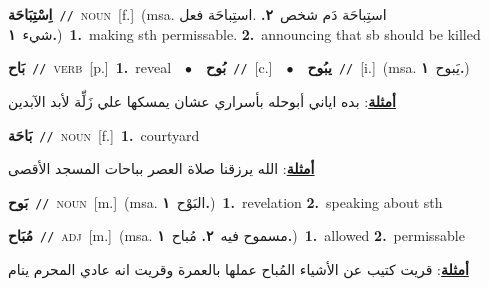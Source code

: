 \documentclass[10pt,a4paper,twoside]{article} %
\begin{document}
\begin{multicols}{2}
{\setlength\topsep{0pt}\textbf{\foreignlanguage{arabic}{اِسْتِبَاحَة}}\ {\color{gray}\texttt{//}\color{black}}\ \textsc{noun}\ [f.]\ \color{gray}(msa. \foreignlanguage{arabic}{استِباحَة دَم شخص}~\foreignlanguage{arabic}{\textbf{٢.}}  .\foreignlanguage{arabic}{استِباحَة فعل شيء}~\foreignlanguage{arabic}{\textbf{١.}})\color{black}\ \textbf{1.}~making sth permissable.  \textbf{2.}~announcing that sb should be killed\ } \vspace{2mm}

{\setlength\topsep{0pt}\textbf{\foreignlanguage{arabic}{بَاح}}\ {\color{gray}\texttt{//}\color{black}}\ \textsc{verb}\ [p.]\ \textbf{1.}~reveal\ \ $\bullet$\ \ \setlength\topsep{0pt}\textbf{\foreignlanguage{arabic}{بُوح}}\ {\color{gray}\texttt{//}\color{black}}\ [c.]\ \ $\bullet$\ \ \setlength\topsep{0pt}\textbf{\foreignlanguage{arabic}{يبُوح}}\ {\color{gray}\texttt{//}\color{black}}\ [i.]\ \color{gray}(msa. \foreignlanguage{arabic}{يَبوح}~\foreignlanguage{arabic}{\textbf{١.}})\color{black}\  \begin{flushright}\color{gray}\foreignlanguage{arabic}{\textbf{\underline{\foreignlanguage{arabic}{أمثلة}}}: بده اياني أبوحله بأسراري عشان يمسكها علي زَلِّة لأبد الآبدين}\end{flushright}\color{black}} \vspace{2mm}

{\setlength\topsep{0pt}\textbf{\foreignlanguage{arabic}{بَاحَة}}\ {\color{gray}\texttt{//}\color{black}}\ \textsc{noun}\ [f.]\ \textbf{1.}~courtyard\  \begin{flushright}\color{gray}\foreignlanguage{arabic}{\textbf{\underline{\foreignlanguage{arabic}{أمثلة}}}: الله يرزقنا صلاة العصر بباحات المسجد الأقصى}\end{flushright}\color{black}} \vspace{2mm}

{\setlength\topsep{0pt}\textbf{\foreignlanguage{arabic}{بَوح}}\ {\color{gray}\texttt{//}\color{black}}\ \textsc{noun}\ [m.]\ \color{gray}(msa. \foreignlanguage{arabic}{البَوْح}~\foreignlanguage{arabic}{\textbf{١.}})\color{black}\ \textbf{1.}~revelation  \textbf{2.}~speaking about sth\ } \vspace{2mm}

{\setlength\topsep{0pt}\textbf{\foreignlanguage{arabic}{مُبَاح}}\ {\color{gray}\texttt{//}\color{black}}\ \textsc{adj}\ [m.]\ \color{gray}(msa. \foreignlanguage{arabic}{مسموح فيه}~\foreignlanguage{arabic}{\textbf{٢.}}  \foreignlanguage{arabic}{مُباح}~\foreignlanguage{arabic}{\textbf{١.}})\color{black}\ \textbf{1.}~allowed  \textbf{2.}~permissable\  \begin{flushright}\color{gray}\foreignlanguage{arabic}{\textbf{\underline{\foreignlanguage{arabic}{أمثلة}}}: قريت كتيب عن الأشياء المُباح عملها بالعمرة وقريت انه عادي المحرم ينام}\end{flushright}\color{black}} \vspace{2mm}


\end{multicols}
\end{document}
